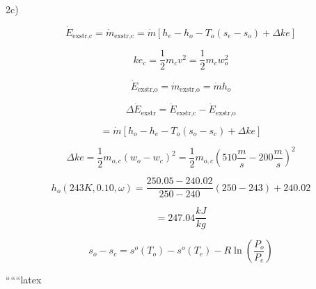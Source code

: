 2c)

\[
\dot{E}_{\text{exstr,c}} = \dot{m}_{\text{exstr,c}} = \dot{m} \left[ h_{e} - h_{o} - T_{o}(s_{e} - s_{o}) + \Delta ke \right]
\]

\[
ke_{c} = \frac{1}{2} m_{c} v^{2} = \frac{1}{2} m_{c} w_{o}^{2}
\]

\[
\dot{E}_{\text{exstr,o}} = \dot{m}_{\text{exstr,o}} = \dot{m} h_{o}
\]

\[
\Delta \dot{E}_{\text{exstr}} = \dot{E}_{\text{exstr,c}} - \dot{E}_{\text{exstr,o}}
\]

\[
= \dot{m} \left[ h_{o} - h_{e} - T_{o}(s_{o} - s_{c}) + \Delta ke \right]
\]

\[
\Delta ke = \frac{1}{2} m_{o,c} (w_{o} - w_{c})^{2} = \frac{1}{2} m_{o,c} \left( 510 \frac{m}{s} - 200 \frac{m}{s} \right)^{2}
\]

\[
h_{o} (243K, 0.10, \omega) = \frac{250.05 - 240.02}{250 - 240} (250 - 243) + 240.02
\]

\[
= 247.04 \frac{kJ}{kg}
\]

\[
s_{o} - s_{c} = s^{o}(T_{o}) - s^{o}(T_{e}) - R \ln \left( \frac{P_{o}}{P_{e}} \right)
\]

``````latex